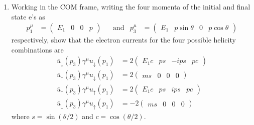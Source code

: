 {\begin{enumerate}[label=\alph*)]
	\item Working in the COM frame, writing the four momenta of the initial and final state e's as 
	\begin{align}
	p_{1}^{\mu}&=\left(\begin{array}{cccc} E_{1} & 0 & 0 & p\end{array}\right) & &\text{and} & p_{3}^{\mu}&=\left(\begin{array}{cccc} E_{1} & p\sin\theta & 0 & p\cos\theta\end{array}\right) 
	\end{align}
	respectively, show that the electron currents for the four possible helicity combinations are 
	\begin{align}
		\bar{u}_{\downarrow}(p_{3})\gamma^{\mu}u_{\downarrow}(p_{1}) &= 2\left(\begin{array}{cccc}E_{1}c & ps & -ips & pc\end{array}\right) \\
		\bar{u}_{\uparrow}(p_{3})\gamma^{\mu}u_{\downarrow}(p_{1})&=2\left(\begin{array}{cccc}ms & 0 & 0 & 0\end{array}\right) \\
		\bar{u}_{\uparrow}(p_{3})\gamma^{\mu}u_{\uparrow}(p_{1})&= 2\left(\begin{array}{cccc}E_{1}c & ps & ips & pc\end{array}\right)\\
		\bar{u}_{\downarrow}(p_{3})\gamma^{\mu}u_{\uparrow}(p_{1})&=-2 \left(\begin{array}{cccc}ms & 0 & 0 & 0\end{array}\right)
	\end{align}
	where \(s=\sin(\theta/2)\) and \(c=\cos(\theta/2)\). 
\end{enumerate}
}\\


